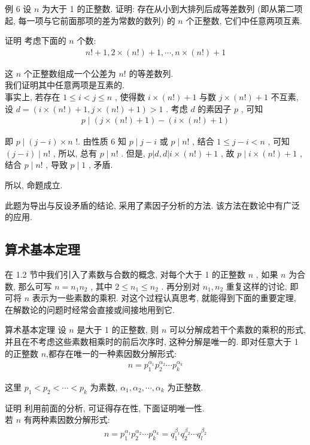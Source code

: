 例 6 设 $n$ 为大于 1 的正整数. 证明: 存在从小到大排列后成等差数列 (即从第二项起, 每一项与它前面那项的差为常数的数列) 的 $n$ 个正整数, 它们中任意两项互素.

证明 考虑下面的 $n$ 个数: 
\begin{align*}
	n!+1,2 \times(n!)+1, \cdots, n \times(n!)+1
\end{align*}

这 $n$ 个正整数组成一个公差为 $n!$ 的等差数列.\\
我们证明其中任意两项是互素的. \\
事实上, 若存在 $1 \leqslant i<j \leqslant n$ , 使得数 $i \times(n!)+1$ 与数 $j \times(n!)+1$ 不互素, 设 $d=(i \times(n!)+1, j \times(n!)+1)>1$ . 考虑 $d$ 的素因子 $p$ , 可知
\begin{align*}
	p \mid(j \times(n!)+1)-(i \times(n!)+1)
\end{align*}

即 $p \mid(j-i) \times n$ !. 由性质 6 知 $p \mid j-i$ 或 $p \mid n!$ , 结合 $1 \leqslant j-i<n$ , 可知 $(j-i) \mid n!$ , 所以, 总有 $p \mid n!$ . 但是,  $p|d, d| i \times(n!)+1$ , 故 $p \mid i \times(n!)+1$ , 结合 $p \mid n!$ , 导致 $p \mid 1$ , 矛盾.

所以, 命题成立.
\begin{note}
此题为导出与反设矛盾的结论, 采用了素因子分析的方法. 该方法在数论中有广泛的应用.
\end{note}

\subsection{算术基本定理}
在 1.2 节中我们引入了素数与合数的概念, 对每个大于 1 的正整数 $n$ , 如果 $n$ 为合数, 那么可写 $n=n_{1} n_{2}$ , 其中 $2 \leqslant n_{1} \leqslant n_{2}$ . 再分别对 $n_{1} ,  n_{2}$ 重复这样的讨论, 即可将 $n$ 表示为一些素数的乘积. 对这个过程认真思考, 就能得到下面的重要定理, 在解数论的问题时经常会直接或间接地用到它.

算术基本定理 设 $n$ 是大于 1 的正整数, 则 $n$ 可以分解成若干个素数的乘积的形式, 并且在不考虑这些素数相乘时的前后次序时, 这种分解是唯一的. 即对任意大于 1 的正整数 $n$,都存在唯一的一种素因数分解形式:
\begin{align*}
	n=p_{1}^{\alpha_{1}} p_{2}^{\alpha_{2}} \cdots p_{k}^{\alpha_{k}}
\end{align*}

这里 $p_{1}<p_{2}<\cdots<p_{k}$ 为素数,  $\alpha_{1}, \alpha_{2}, \cdots, \alpha_{k}$ 为正整数.

证明 利用前面的分析, 可证得存在性, 下面证明唯一性. \\
若 $n$ 有两种素因数分解形式:
\begin{align*}
	n=p_{1}^{\alpha_{1}} p_{2}^{\alpha_{2}} \cdots p_{k}^{\alpha_{k}}=q_{1}^{\beta_{1}} q_{2}^{\beta_{2}} \cdots q_{l}^{\beta_{2}}
\end{align*}

